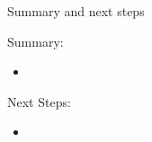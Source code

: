 \documentclass[8pt]{beamer}
\begin{document}
\begin{frame}{Summary and next steps}
 
\begin{block}{Summary:}
 
\begin{itemize}
  \item
\end{itemize}

\end{block}

\begin{block}{Next Steps:}
 
\begin{itemize}
  \item 
\end{itemize}
 
\end{block}

\end{frame}
\end{document}
